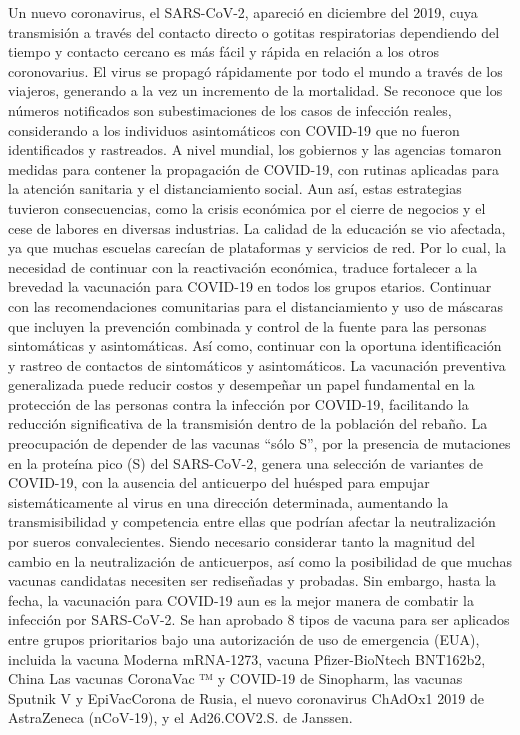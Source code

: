 \documentclass[12pt,a4paper,openany]{book}
\begin{document}
	\noindent Un nuevo coronavirus, el SARS-CoV-2, apareció en diciembre del 2019, cuya transmisión a través del contacto directo o gotitas respiratorias dependiendo del tiempo y contacto cercano es más fácil y rápida en relación a los otros coronovarius. El virus se propagó rápidamente por todo el mundo a través de los viajeros, generando a la vez un incremento de la mortalidad. Se reconoce que los números notificados son subestimaciones de los casos de infección reales, considerando a los individuos asintomáticos con COVID-19 que no fueron identificados y rastreados.
	A nivel mundial, los gobiernos y las agencias tomaron medidas para contener la propagación de COVID-19, con rutinas aplicadas para la atención sanitaria y el distanciamiento social. Aun así, estas estrategias tuvieron consecuencias, como la crisis económica por el cierre de negocios y el cese de labores en diversas industrias. La calidad de la educación se vio afectada, ya que muchas escuelas carecían de plataformas y servicios de red. Por lo cual, la necesidad de continuar con la reactivación económica, traduce fortalecer a la brevedad la vacunación para COVID-19 en todos los grupos etarios. Continuar con las recomendaciones comunitarias para el distanciamiento y uso de máscaras que incluyen la prevención combinada y control de la fuente para las personas sintomáticas y asintomáticas. Así como, continuar con la oportuna identificación y rastreo de contactos de sintomáticos y asintomáticos.
	La vacunación preventiva generalizada puede reducir costos y desempeñar un papel fundamental en la protección de las personas contra la infección por COVID-19, facilitando la reducción significativa de la transmisión dentro de la población del rebaño. La preocupación de depender de las vacunas “sólo S”, por la presencia de mutaciones en la proteína pico (S) del SARS-CoV-2, genera una selección de variantes de COVID-19, con la ausencia del anticuerpo del huésped para empujar sistemáticamente al virus en una dirección determinada, aumentando la transmisibilidad y competencia entre ellas que podrían afectar la neutralización por sueros convalecientes. Siendo necesario considerar tanto la magnitud del cambio en la neutralización de anticuerpos, así como la posibilidad de que muchas vacunas candidatas necesiten ser rediseñadas y probadas.  Sin embargo, hasta la fecha, la vacunación para COVID-19 aun es la mejor manera de combatir la infección por SARS-CoV-2. Se han aprobado 8 tipos de vacuna para ser aplicados entre grupos prioritarios bajo una autorización de uso de emergencia (EUA), incluida la vacuna Moderna mRNA-1273, vacuna Pfizer-BioNtech BNT162b2, China Las vacunas CoronaVac ™ y COVID-19 de Sinopharm, las vacunas Sputnik V y EpiVacCorona de Rusia, el nuevo coronavirus ChAdOx1 2019 de AstraZeneca (nCoV-19), y el Ad26.COV2.S. de Janssen.
\end{document}
